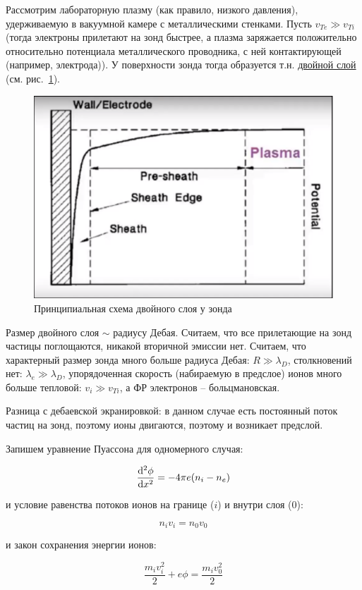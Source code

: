 \documentclass[10pt, a4paper]{article}
\begin{document}
Рассмотрим лабораторную плазму (как правило, низкого давления), удерживаемую в вакуумной камере с металлическими стенками. Пусть $v_{Te}\gg v_{Ti}$ (тогда электроны прилетают на зонд быстрее, а плазма заряжается положительно относительно потенциала металлического проводника, с ней контактирующей (например, электрода)). У поверхности зонда тогда образуется т.н. \uline{двойной слой} (см. рис.~\ref{fig:double_layer}).

\begin{figure}[ht]
	\begin{center}
		\includegraphics[width=0.5\linewidth]{double_layer}
	\end{center}
	\caption{Принципиальная схема двойного слоя у зонда}
	\label{fig:double_layer}
\end{figure}

Размер двойного слоя $\sim$ радиусу Дебая. Считаем, что все прилетающие на зонд частицы поглощаются, никакой вторичной эмиссии нет. Считаем, что характерный размер зонда много больше радиуса Дебая: $R\gg \lambda_D$, столкновений нет: $\lambda_e\gg\lambda_D$, упорядоченная скорость (набираемую в предслое) ионов много больше тепловой: $v_i\gg v_{Ti}$, а ФР электронов -- больцмановская.

Разница с дебаевской экранировкой: в данном случае есть постоянный поток частиц на зонд, поэтому ионы двигаются, поэтому и возникает предслой. 

Запишем уравнение Пуассона для одномерного случая:

\begin{equation*}
	\dv[2]{\phi}{x} = -4\pi e(n_i-n_e)
\end{equation*}

и условие равенства потоков ионов на границе ($i$) и внутри слоя ($0$):

\begin{equation*}
	n_iv_i = n_0v_0
\end{equation*}

и закон сохранения энергии ионов:

\begin{equation*}
	\frac{m_iv_i^2}{2} + e\phi = \frac{m_iv_0^2}{2}
\end{equation*}
\end{document}

